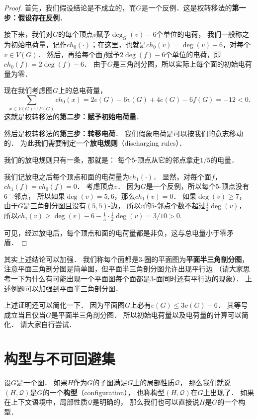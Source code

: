 \documentclass[cn,fancy,blue,11pt]{elegantbook}
\begin{document}
\begin{proof}
	首先，我们假设结论是不成立的，而$G$是一个反例．这是权转移法的\textbf{第一步：假设存在反例}．
	
	接下来，我们对$G$的每个顶点$v$赋予$\deg_G(v)-6$个单位的电荷，
	我们一般称之为初始电荷量，记作$ch_0(\cdot)$；在这里，也就是$ch_0(v)=\deg(v)-6$，对每个$v\in V(G)$．
	然后，再给每个面$f$赋予$2\deg(f)-6$个单位的电荷，即$ch_0(f)=2\deg(f)-6$．
	由于$G$是三角剖分图，所以实际上每个面的初始电荷量为零．

	现在我们考虑图$G$上的总电荷量，
	\[\sum_{x\in V(G)\cup F(G)}ch_0(x)=2e(G)-6v(G)+4e(G)-6f(G)=-12<0.\]
	这就是权转移法的\textbf{第二步：赋予初始电荷量}．

	然后是权转移法的\textbf{第三步：转移电荷}．
	我们假象电荷是可以按我们的意志移动的．
	为此我们需要制定一个\textbf{放电规则}（discharging rules）．

	我们的放电规则只有一条，那就是：
	每个$5$-顶点从它的邻点拿走$1/5$的电量．

	我们记放电之后每个顶点和面的电荷量为$ch_1(\cdot)$．
	显然，对每个面$f$，$ch_1(f)=ch_0(f)=0$．
	考虑顶点$v$．
	因为$G$是一个反例，所以每个$5$-顶点没有$6^-$-邻点，
	所以如果$\deg(v)=5,6$，那么$ch_1(v)=0$．
	如果$\deg(v)\ge7$，
	由于$G$是三角剖分图且没有$(5,5)$-边，
	所以$v$的$5$-邻点个数不超过$\frac{1}{2}\deg(v)$，
	所以$ch_1(v)\ge\deg(v)-6-\frac{1}{5}\cdot\frac{1}{2}\deg(v)=3/10>0.$

	可见，经过放电后，每个顶点和面的电荷量都是非负，这与总电量小于零矛盾．
\end{proof}

其实上述结论可以加强．
我们称每个面都是3-圈的平面图为\textbf{平面半三角剖分图}，
注意平面三角剖分图是简单图，但平面半三角剖分图允许出现平行边
（请大家思考一下为什么有可能出现一个平面图每个面都是3-面同时还有平行边的现象）．
上述例题可以加强到平面半三角剖分图．

上述证明还可以简化一下．
因为平面图$G$上必有$e(G)\le 3v(G)-6$．
其等号成立当且仅当$G$是平面半三角剖分图．
所以初始电荷量以及电荷量的计算可以简化．
请大家自行尝试．

\section{构型与不可回避集}

设$G$是一个图．
如果$H$作为$G$的子图满足$G$上的局部性质$\mathcal{Q}$，
那么我们就说$(H,\mathcal{Q})$是$G$的一个\textbf{构型}（configuration），
也称构型$(H,\mathcal{Q})$在$G$上出现了．
如果在上下文语境中，局部性质$\mathcal{Q}$是明确的，
那么我们也可以直接说$H$是$G$的一个构型．
\end{document}
